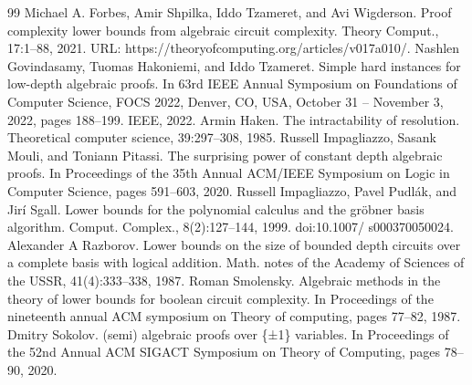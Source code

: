 \begin{thebibliography}{99}
 Michael A. Forbes, Amir Shpilka, Iddo Tzameret, and Avi Wigderson. Proof complexity lower bounds from algebraic circuit complexity. Theory Comput., 17:1–88, 2021. URL: https://theoryofcomputing.org/articles/v017a010/.
 Nashlen Govindasamy, Tuomas Hakoniemi, and Iddo Tzameret. Simple hard instances for low-depth algebraic proofs. In 63rd IEEE Annual Symposium on Foundations of Computer Science, FOCS 2022, Denver, CO, USA, October 31 – November 3, 2022, pages 188–199. IEEE, 2022.
 Armin Haken. The intractability of resolution. Theoretical computer science, 39:297–308, 1985.
 Russell Impagliazzo, Sasank Mouli, and Toniann Pitassi. The surprising power of constant depth algebraic proofs. In Proceedings of the 35th Annual ACM/IEEE Symposium on Logic in Computer Science, pages 591–603, 2020.
 Russell Impagliazzo, Pavel Pudlák, and Jirí Sgall. Lower bounds for the polynomial calculus and the gröbner basis algorithm. Comput. Complex., 8(2):127–144, 1999. doi:10.1007/ s000370050024.
 Alexander A Razborov. Lower bounds on the size of bounded depth circuits over a complete basis with logical addition. Math. notes of the Academy of Sciences of the USSR, 41(4):333–338, 1987.
 Roman Smolensky. Algebraic methods in the theory of lower bounds for boolean circuit complexity. In Proceedings of the nineteenth annual ACM symposium on Theory of computing, pages 77–82, 1987.
 Dmitry Sokolov. (semi) algebraic proofs over \{±1\} variables. In Proceedings of the 52nd Annual ACM SIGACT Symposium on Theory of Computing, pages 78–90, 2020.
\end{thebibliography}
